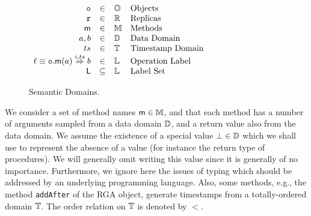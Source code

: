 \begin{figure}
  \centering
  \(
  \begin{array}[t]{rcll}
    \mathtt{o} & \in  & \mathbb{O} & \text{Objects} \\
    \mathtt{r} & \in & \mathbb{R} & \text{Replicas} \\
    \mathsf{m} & \in & \mathbb{M} & \text{Methods}\\
    a, b & \in & \mathbb{D} & \text{Data Domain} \\
    ts & \in & \mathbb{T} & \text{Timestamp Domain} \\
    \ell \equiv {{\ensuremath{\mathtt{o}}.\ensuremath{\mathsf{m}}}}(a) \overset{i,ts}{\Rightarrow} b & \in & \mathbb{L} & \text{Operation Label} \\
    \mathsf{L} & \subseteq & \mathbb{L} & \text{Label Set}\\
  \end{array}
  \)
  \caption{Semantic Domains.}
  \label{fig:sem-dom}
\end{figure}


We consider a set of method names $\mathsf{m} \in \mathbb{M}$, and that
each method has a number of arguments sampled from a data domain
$\mathbb{D}$, and a return value also from the data domain.
%
We assume the existence of a special value $\bot \in \mathbb{D}$
which we shall use to represent the absence of a value (for instance
the return type of procedures).
%
We will generally omit writing this value since it is generally of no
importance.
%
Furthermore, we ignore here the issues of typing which should be
addressed by an underlying programming language.
Also, some methods, e.g., the method {\tt addAfter} of the RGA object, generate timestamps from a
totally-ordered domain $\mathbb{T}$. The order relation on $\mathbb{T}$ is denoted by $<$.

